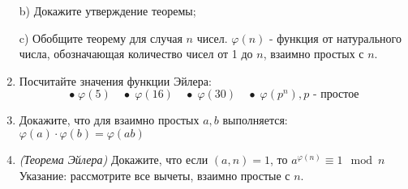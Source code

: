 \begin{enumerate}
b) Докажите утверждение теоремы;

c) Обобщите теорему для случая $n$ чисел.
 $\varphi(n)$ - функция от натурального числа, обозначающая количество
чисел от 1 до $n$, взаимно простых с $n$.

\item Посчитайте значения функции Эйлера:
\[\bullet\; \varphi(5) \quad \bullet \; \varphi(16) \quad \bullet \;\varphi(30) \quad \bullet \;
\varphi(p^n), \text{$p$ - простое} \]
\item Докажите, что для взаимно простых $a, b$ выполняется: {\large$\varphi(a) \cdot \varphi(b) =
\varphi(ab)$}
\item {\it (Теорема Эйлера)} Докажите, что если $(a, n) = 1$, то $a^{\varphi(n)} \equiv 1 \mod n$\\
Указание: рассмотрите все вычеты, взаимно простые с $n$.
\end{enumerate}
